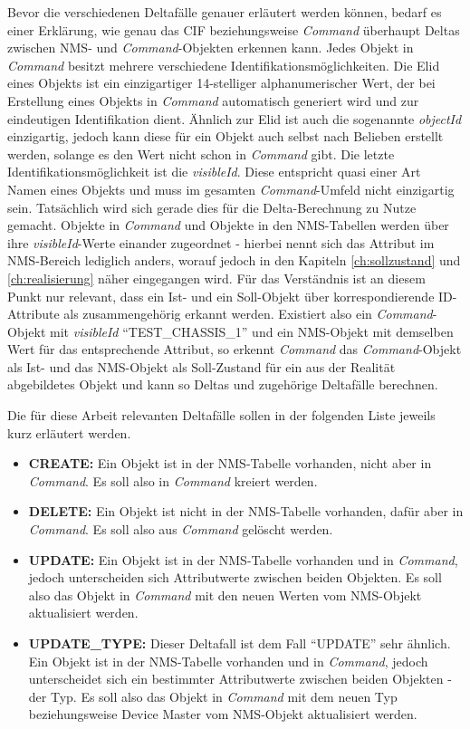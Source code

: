 Bevor die verschiedenen Deltafälle genauer erläutert werden können, bedarf es einer Erklärung, wie genau das \ac{CIF} beziehungsweise \textit{Command} überhaupt Deltas zwischen \ac{NMS}- und \textit{Command}-Objekten erkennen kann. Jedes Objekt in \textit{Command} besitzt mehrere verschiedene Identifikationsmöglichkeiten. Die \ac{Elid} eines Objekts ist ein einzigartiger 14-stelliger alphanumerischer Wert, der bei Erstellung eines Objekts in \textit{Command} automatisch generiert wird und zur eindeutigen Identifikation dient. Ähnlich zur \ac{Elid} ist auch die sogenannte \textit{objectId} einzigartig, jedoch kann diese für ein Objekt auch selbst nach Belieben erstellt werden, solange es den Wert nicht schon in \textit{Command} gibt. Die letzte Identifikationsmöglichkeit ist die \textit{visibleId}. Diese entspricht quasi einer Art Namen eines Objekts und muss im gesamten \textit{Command}-Umfeld nicht einzigartig sein. Tatsächlich wird sich gerade dies für die Delta-Berechnung zu Nutze gemacht. Objekte in \textit{Command} und Objekte in den \ac{NMS}-Tabellen werden über ihre \textit{visibleId}-Werte einander zugeordnet - hierbei nennt sich das Attribut im \ac{NMS}-Bereich lediglich anders, worauf jedoch in den Kapiteln \ref{ch:sollzustand} und \ref{ch:realisierung} näher eingegangen wird. Für das Verständnis ist an diesem Punkt nur relevant, dass ein Ist- und ein Soll-Objekt über korrespondierende ID-Attribute als zusammengehörig erkannt werden. Existiert also ein \textit{Command}-Objekt mit \textit{visibleId} \enquote{TEST\_CHASSIS\_1} und ein \ac{NMS}-Objekt mit demselben Wert für das entsprechende Attribut, so erkennt \textit{Command} das \textit{Command}-Objekt als Ist- und das \ac{NMS}-Objekt als Soll-Zustand für ein aus der Realität abgebildetes Objekt und kann so Deltas und zugehörige Deltafälle berechnen.

Die für diese Arbeit relevanten Deltafälle sollen in der folgenden Liste jeweils kurz erläutert werden.
\begin{itemize}
    \item \textbf{CREATE:} Ein Objekt ist in der \ac{NMS}-Tabelle vorhanden, nicht aber in \textit{Command}. Es soll also in \textit{Command} kreiert werden.
    \item \textbf{DELETE:} Ein Objekt ist nicht in der \ac{NMS}-Tabelle vorhanden, dafür aber in \textit{Command}. Es soll also aus \textit{Command} gelöscht werden.
    \item \textbf{UPDATE:} Ein Objekt ist in der \ac{NMS}-Tabelle vorhanden und in \textit{Command}, jedoch unterscheiden sich Attributwerte zwischen beiden Objekten. Es soll also das Objekt in \textit{Command} mit den neuen Werten vom \ac{NMS}-Objekt aktualisiert werden.
    \item \textbf{UPDATE\_TYPE:} Dieser Deltafall ist dem Fall \enquote{UPDATE} sehr ähnlich. Ein Objekt ist in der \ac{NMS}-Tabelle vorhanden und in \textit{Command}, jedoch unterscheidet sich ein bestimmter Attributwerte zwischen beiden Objekten - der Typ. Es soll also das Objekt in \textit{Command} mit dem neuen Typ beziehungsweise Device Master vom \ac{NMS}-Objekt aktualisiert werden.
\end{itemize}

